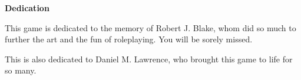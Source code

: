 \textbf{\huge Dedication}

This game is dedicated to the memory of Robert J. Blake, whom did so much to further the art and the fun of roleplaying.
You will be sorely missed.

This is also dedicated to Daniel M. Lawrence, who brought this game to life for so many.